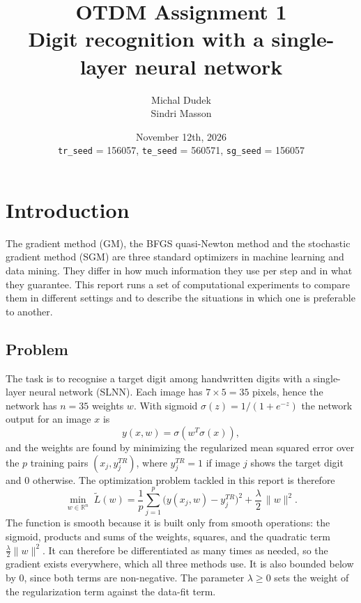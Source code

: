 \documentclass{article}
\title{OTDM Assignment 1\\ Digit recognition with a single-layer neural network}
\author{Michal Dudek \\ Sindri Masson}
\date{November 12th, 2026\\[1ex]
\small \texttt{tr\_seed} = 156057, \quad \texttt{te\_seed} = 560571, \quad \texttt{sg\_seed} = 156057}
\begin{document}
\maketitle

\section{Introduction}

The gradient method (GM), the BFGS quasi-Newton method and the stochastic gradient method (SGM) are three standard optimizers in machine learning and data mining. They differ in how much information they use per step and in what they guarantee. This report runs a set of computational experiments to compare them in different settings and to describe the situations in which one is preferable to another.

\subsection*{Problem}
The task is to recognise a target digit among handwritten digits with a single-layer neural network (SLNN). Each image has $7\times 5 = 35$ pixels, hence the network has $n=35$ weights $w$. With sigmoid $\sigma(z)=1/(1+e^{-z})$ the network output for an image $x$ is
\begin{equation}
  y(x,w) = \sigma\!\left(w^{T}\sigma(x)\right),
\end{equation}
and the weights are found by minimizing the regularized mean squared error over the $p$ training pairs $(x_j, y_j^{TR})$, where $y_j^{TR}=1$ if image $j$ shows the target digit and $0$ otherwise. The optimization problem tackled in this report is therefore
\begin{equation}
  \min_{w\in\mathbb{R}^{n}} \; \tilde L(w) = \frac{1}{p}\sum_{j=1}^{p}\bigl(y(x_j,w)-y_j^{TR}\bigr)^2 + \frac{\lambda}{2}\,\|w\|^2 .
  \label{eq:loss}
\end{equation}
The function is smooth because it is built only from smooth operations: the sigmoid, products and sums of the weights, squares, and the quadratic term $\tfrac{\lambda}{2}\|w\|^2$. It can therefore be differentiated as many times as needed, so the gradient exists everywhere, which all three methods use. It is also bounded below by $0$, since both terms are non-negative. The parameter $\lambda\ge 0$ sets the weight of the regularization term against the data-fit term.
\end{document}
